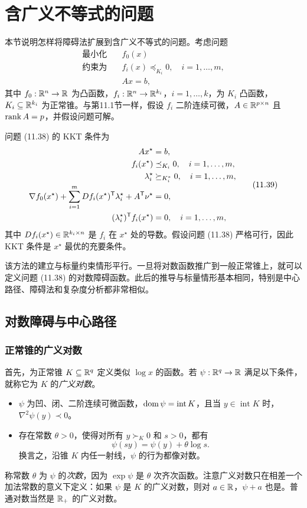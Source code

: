 \section{含广义不等式的问题}
本节说明怎样将障碍法扩展到含广义不等式的问题。考虑问题
\begin{equation}\begin{aligned}
\text{最小化}\quad&f_0(x)\\
\text{约束为}\quad&f_i(x)\preceq_{K_i}0,\quad i=1,\ldots,m,\\
&Ax=b,
\end{aligned}\tag{11.38}\end{equation}
其中 $f_0:\mathbb R^n\to\mathbb R$ 为凸函数，$f_i:\mathbb R^n\to\mathbb R^{k_i}$，$i=1,\ldots,k$，为 $K_i$ 凸函数，$K_i\subseteq\mathbb R^{k_i}$ 为正常锥。与第11.1节一样，假设 $f_i$ 二阶连续可微，$A\in\mathbb R^{p\times n}$ 且 $\operatorname{rank} A=p$，并假设问题可解。

问题 (11.38) 的 KKT 条件为
\begin{equation}\begin{aligned}
Ax^\star&=b,\\
f_i(x^\star)&\preceq_{K_i}0,\quad i=1,\ldots,m,\\
\lambda_i^\star&\succeq_{K_i^*}0,\quad i=1,\ldots,m,\\
\nabla f_0(x^\star)+\sum_{i=1}^m Df_i(x^\star)^\mathsf T\lambda_i^\star+A^\mathsf T\nu^\star&=0,\\
(\lambda_i^\star)^\mathsf T f_i(x^\star)&=0,\quad i=1,\ldots,m,
\end{aligned}\tag{11.39}\end{equation}
其中 $Df_i(x^\star)\in\mathbb R^{k_i\times n}$ 是 $f_i$ 在 $x^\star$ 处的导数。假设问题 (11.38) 严格可行，因此 KKT 条件是 $x^\star$ 最优的充要条件。

该方法的建立与标量约束情形平行。一旦将对数函数推广到一般正常锥上，就可以定义问题 (11.38) 的对数障碍函数。此后的推导与标量情形基本相同，特别是中心路径、障碍法和复杂度分析都非常相似。

\subsection{对数障碍与中心路径}
\subsubsection*{正常锥的广义对数}
首先，为正常锥 $K\subseteq\mathbb R^q$ 定义类似 $\log x$ 的函数。若 $\psi:\mathbb R^q\to\mathbb R$ 满足以下条件，就称它为 $K$ 的\emph{广义对数}。
\begin{itemize}
\item $\psi$ 为凹、闭、二阶连续可微函数，$\operatorname{dom}\psi=\operatorname{int}K$，且当 $y\in\operatorname{int}K$ 时，$\nabla^2\psi(y)\prec0$。
\item 存在常数 $\theta>0$，使得对所有 $y\succ_K0$ 和 $s>0$，都有
\[
\psi(sy)=\psi(y)+\theta\log s.
\]
换言之，沿锥 $K$ 内任一射线，$\psi$ 的行为都像对数。
\end{itemize}
称常数 $\theta$ 为 $\psi$ 的\emph{次数}，因为 $\exp\psi$ 是 $\theta$ 次齐次函数。注意广义对数只在相差一个加法常数的意义下定义：如果 $\psi$ 是 $K$ 的广义对数，则对 $a\in\mathbb R$，$\psi+a$ 也是。普通对数当然是 $\mathbb R_+$ 的广义对数。

